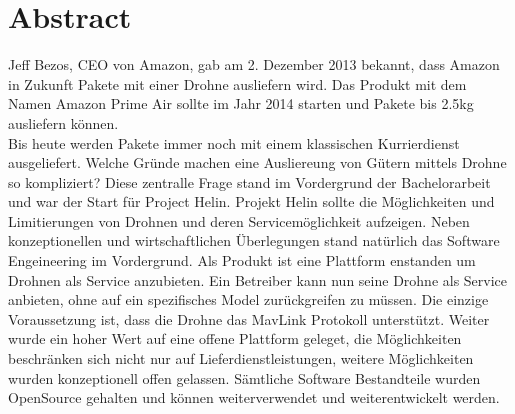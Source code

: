 \newpage
{}
\chapter*{Abstract}
Jeff Bezos, CEO von Amazon, gab am 2. Dezember 2013 bekannt, dass Amazon in Zukunft Pakete mit einer Drohne ausliefern wird. Das Produkt mit dem Namen Amazon Prime Air sollte im Jahr 2014 starten und Pakete bis 2.5kg ausliefern können. \\
Bis heute werden Pakete immer noch mit einem klassischen Kurrierdienst ausgeliefert. Welche Gründe machen eine Ausliereung von Gütern mittels Drohne so kompliziert? Diese zentralle Frage stand im Vordergrund der Bachelorarbeit und war der Start für Project Helin. 
Projekt Helin sollte die Möglichkeiten und Limitierungen von Drohnen und deren Servicemöglichkeit aufzeigen.
Neben konzeptionellen und wirtschaftlichen Überlegungen stand natürlich das Software Engeineering im Vordergrund. Als Produkt ist eine Plattform enstanden um Drohnen als Service anzubieten. Ein Betreiber kann nun seine Drohne als Service anbieten, ohne auf ein spezifisches Model zurückgreifen zu müssen. Die einzige Voraussetzung ist, dass die Drohne das MavLink Protokoll unterstützt. Weiter wurde ein hoher Wert auf eine offene Plattform geleget, die Möglichkeiten beschränken sich nicht nur auf Lieferdienstleistungen, weitere Möglichkeiten wurden konzeptionell offen gelassen. Sämtliche Software Bestandteile wurden OpenSource gehalten und können weiterverwendet und weiterentwickelt werden.